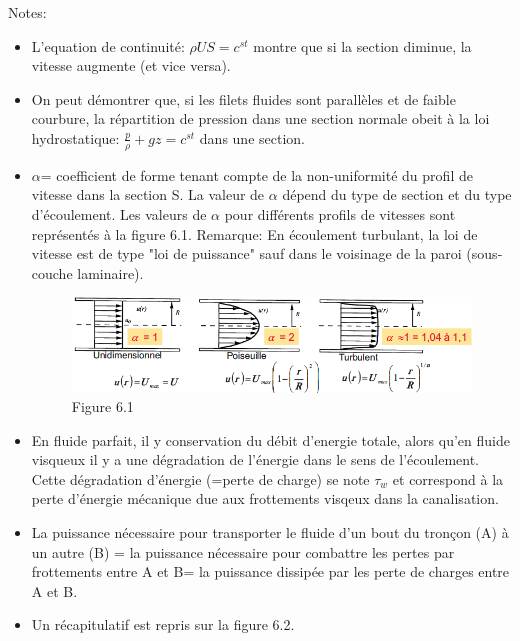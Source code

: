 Notes: 
\begin{itemize}
\item L'equation de continuité: $\rho US=c^{st}$ montre que si la section diminue, la vitesse augmente (et vice versa).
\item On peut démontrer que, si les filets fluides sont parallèles et de faible courbure, la répartition de pression dans une section normale obeit à la loi hydrostatique: $\frac{p}{\rho}+gz=c^{st}$ dans une section.
\item $\alpha$= coefficient de forme tenant compte de la non-uniformité du profil de vitesse dans la section S. La valeur de $\alpha$ dépend du type de section et du type d'écoulement. Les valeurs de $\alpha$ pour différents profils de vitesses sont représentés à la figure 6.1. Remarque: En écoulement turbulant, la loi de vitesse est de type "loi de puissance" sauf dans le voisinage de la paroi (sous-couche laminaire). 
\begin{figure}[h]
\begin {center}
\includegraphics[scale=0.35]{ch6/61.png}
\caption*{Figure 6.1}
\end{center}
\end{figure}
\item En fluide parfait, il y conservation du débit d'energie totale, alors qu'en fluide visqueux il y a une dégradation de l'énergie dans le sens de l'écoulement. Cette dégradation d'énergie (=perte de charge) se note $\tau_w$ et correspond à la perte d'énergie mécanique due aux frottements visqeux dans la canalisation.
\item La puissance nécessaire pour transporter le fluide d'un bout du tronçon (A) à un autre (B) = la puissance nécessaire pour combattre les pertes par frottements entre A et B= la puissance dissipée par les perte de charges entre A et B.
\item Un récapitulatif est repris sur la figure 6.2.
\end{itemize}

